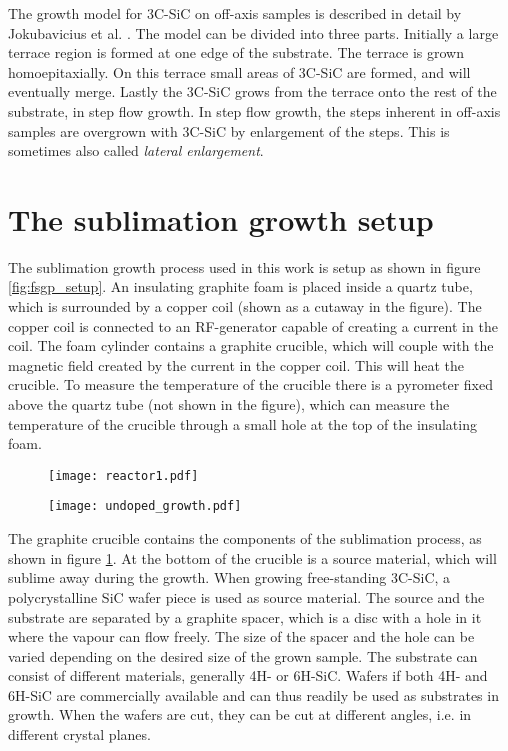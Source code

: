  The growth model for 3C-SiC on off-axis samples is described in detail by Jokubavicius et al. \cite{Jokubavicius2014}. The model can be divided into three parts. Initially a large terrace region is formed at one edge of the substrate. The terrace is grown homoepitaxially. On this terrace small areas of 3C-SiC are formed, and will eventually merge. Lastly the 3C-SiC grows from the terrace onto the rest of the substrate, in step flow growth. In step flow growth, the steps inherent in off-axis samples are overgrown with 3C-SiC by enlargement of the steps. This is sometimes also called \emph{lateral enlargement}.
 
\section{The sublimation growth setup}
\label{sec:growth:fsgp}
The sublimation growth process used in this work is setup as shown in figure \ref{fig:fsgp_setup}. An insulating graphite foam is placed inside a quartz tube, which is surrounded by a copper coil (shown as a cutaway in the figure). The copper coil is connected to an RF-generator capable of creating a current in the coil. The foam cylinder contains a graphite crucible, which will couple with the magnetic field created by the current in the copper coil. This will heat the crucible. To measure the temperature of the crucible there is a pyrometer fixed above the quartz tube (not shown in the figure), which can measure the temperature of the crucible through a small hole at the top of the insulating foam. 

\begin{figure}[h]
\centering
\begin{minipage}{.5\textwidth}
  \centering
  \texttt{[image: reactor1.pdf]}
  \label{fig:fsgp_setup}
\end{minipage}%
\begin{minipage}{.5\textwidth}
  \centering
  \texttt{[image: undoped\_growth.pdf]}
  \label{fig:undoped_growth}
\end{minipage}
\end{figure}

The graphite crucible contains the components of the sublimation process, as shown in figure \ref{fig:undoped_growth}. At the bottom of the crucible is a source material, which will sublime away during the growth. When growing free-standing 3C-SiC, a polycrystalline SiC wafer piece is used as source material. The source and the substrate are separated by a graphite spacer, which is a disc with a hole in it where the vapour can flow freely. The size of the spacer and the hole can be varied depending on the desired size of the grown sample. The substrate can consist of different materials, generally 4H- or 6H-SiC. Wafers if both 4H- and 6H-SiC are commercially available and can thus readily be used as substrates in growth. When the wafers are cut, they can be cut at different angles, i.e. in different crystal planes.

